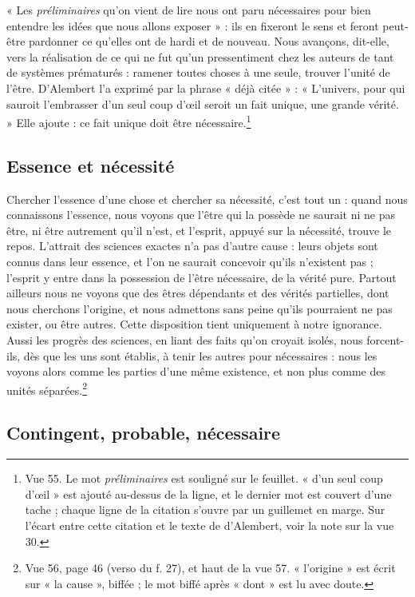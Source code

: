 \documentclass[11pt,a4paper]{article}
\begin{document}
« Les \emph{préliminaires} qu'on vient de lire nous ont paru nécessaires pour
bien entendre les idées que nous allons exposer » : ils en fixeront le sens et
feront peut-être pardonner ce qu'elles ont de hardi et de nouveau. Nous
avançons, dit-elle, vers la réalisation de ce qui ne fut qu'un pressentiment
chez les auteurs de tant de systèmes prématurés : ramener toutes choses à une
seule, trouver l'unité de l'être. D'Alembert l'a exprimé par la phrase « déjà
citée » : « L'univers, pour qui sauroit l'embrasser d'un seul coup d'œil seroit
un fait unique, une grande vérité. » Elle ajoute : ce fait unique doit être
nécessaire.\footnote{Vue 55. Le mot \emph{préliminaires} est souligné sur le
feuillet. « d'un seul coup d'œil » est ajouté au-dessus de la ligne, et le
dernier mot est couvert d'une tache ; chaque ligne de la citation s'ouvre par un
guillemet en marge. Sur l'écart entre cette citation et le texte de
d'Alembert, voir la note sur la vue 30.}

\subsection*{Essence et nécessité}

Chercher l'essence d'une chose et chercher sa nécessité, c'est tout un : quand
nous connaissons l'essence, nous voyons que l'être qui la possède ne saurait ni
ne pas être, ni être autrement qu'il n'est, et l'esprit, appuyé sur la
nécessité, trouve le repos. L'attrait des sciences exactes n'a pas d'autre
cause : leurs objets sont connus dans leur essence, et l'on ne saurait concevoir
qu'ils n'existent pas ; l'esprit y entre dans la possession de l'être nécessaire,
de la vérité pure. Partout ailleurs nous ne voyons que des êtres dépendants et
des vérités partielles, dont nous cherchons l'origine, et nous admettons sans
peine qu'ils pourraient ne pas exister, ou être autres. Cette disposition tient
uniquement à notre ignorance. Aussi les progrès des sciences, en liant des faits
qu'on croyait isolés, nous forcent-ils, dès que les uns sont établis, à tenir les
autres pour nécessaires : nous les voyons alors comme les parties d'une même
existence, et non plus comme des unités séparées.\footnote{Vue 56, page 46
(verso du f. 27), et haut de la vue 57. « l'origine » est écrit sur « la
cause », biffée ; le mot biffé après « dont » est lu avec doute.}

\subsection*{Contingent, probable, nécessaire}
\end{document}
